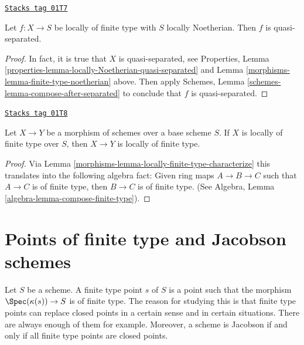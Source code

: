 \begin{lemma}
\label{morphisms-lemma-finite-type-Noetherian-quasi-separated}
\href{https://stacks.math.columbia.edu/tag/01T7}{\texttt{Stacks tag 01T7}}

Let $f : X \to S$ be locally of finite type with $S$ locally Noetherian.
Then $f$ is quasi-separated.
\end{lemma}

\begin{proof}

In fact, it is true that $X$ is quasi-separated, see
Properties, Lemma \ref{properties-lemma-locally-Noetherian-quasi-separated}
and Lemma \ref{morphisms-lemma-finite-type-noetherian} above.
Then apply Schemes, Lemma \ref{schemes-lemma-compose-after-separated}
to conclude that $f$ is quasi-separated.
\end{proof}

\begin{lemma}
\label{morphisms-lemma-permanence-finite-type}
\href{https://stacks.math.columbia.edu/tag/01T8}{\texttt{Stacks tag 01T8}}

Let $X \to Y$ be a morphism of schemes over a base scheme $S$.
If $X$ is locally of finite type over $S$, then $X \to Y$
is locally of finite type.
\end{lemma}

\begin{proof}

Via Lemma \ref{morphisms-lemma-locally-finite-type-characterize} this translates
into the following algebra
fact: Given ring maps $A \to B \to C$ such that $A \to C$ is
of finite type, then $B \to C$ is of finite type.
(See
Algebra, Lemma \ref{algebra-lemma-compose-finite-type}).
\end{proof}

\section{Points of finite type and Jacobson schemes}
\label{morphisms-section-points-finite-type}
Let $S$ be a scheme. A finite type point $s$ of $S$ is a point such
that the morphism $\Spec(\kappa(s)) \to S$ is of finite type.
The reason for studying this is that finite type points can replace
closed points in a certain sense and in certain situations.
There are always enough of them for example. Moreover, a scheme
is Jacobson if and only if all finite type points are closed points.

